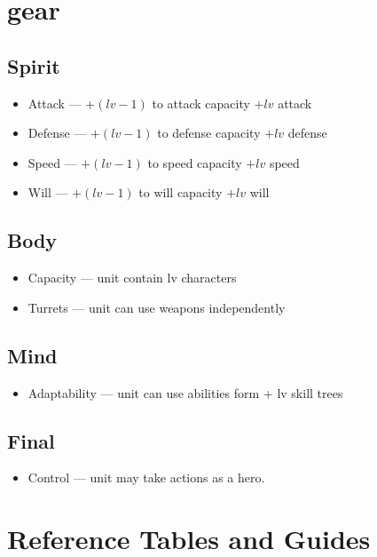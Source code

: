 \section{gear}
\subsection{Spirit}
\begin{itemize}
\item Attack --- $+(lv -1)$ to attack capacity $+lv$ attack 
\item Defense --- $+(lv -1)$ to defense capacity $+lv$ defense
\item Speed --- $+(lv -1)$ to speed capacity $+lv$ speed
\item Will --- $+(lv -1)$ to will capacity $+lv$ will
\end{itemize}

\subsection{Body}
\begin{itemize}
\item Capacity --- unit contain lv characters
\item Turrets --- unit can use weapons independently
\end{itemize}

\subsection{Mind}
\begin{itemize}
\item Adaptability --- unit can use abilities form + lv skill trees
\end{itemize}

\subsection{Final}
\begin{itemize}
\item Control --- unit may take actions as a hero.
\end{itemize}

\section{Reference Tables and Guides}
